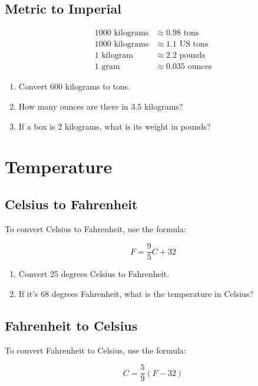 \documentclass{article}
\begin{document}
\subsection*{Metric to Imperial}

\begin{align*}
1000 \text{ kilograms} &\approx 0.98 \text{ tons} \\
1000 \text{ kilograms} &\approx 1.1 \text{ US tons} \\
1 \text{ kilogram} &\approx 2.2 \text{ pounds} \\
1 \text{ gram} &\approx 0.035 \text{ ounces}
\end{align*}

\begin{enumerate}
    \item Convert 600 kilograms to tons.
    \item How many ounces are there in 3.5 kilograms?
    \item If a box is 2 kilograms, what is its weight in pounds?
\end{enumerate}

\section*{Temperature}

\subsection*{Celsius to Fahrenheit}
To convert Celsius to Fahrenheit, use the formula:

\begin{equation*}
    F = \frac{9}{5}C + 32
\end{equation*}

\begin{enumerate}
    \item Convert 25 degrees Celsius to Fahrenheit.
    \item If it's 68 degrees Fahrenheit, what is the temperature in Celsius?
\end{enumerate}

\subsection*{Fahrenheit to Celsius}
To convert Fahrenheit to Celsius, use the formula:

\begin{equation*}
    C = \frac{5}{9}(F - 32)
\end{equation*}
\end{document}
